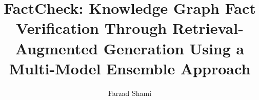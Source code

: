 \documentclass{DEIThesis}
\title{FactCheck: Knowledge Graph Fact Verification Through Retrieval-Augmented Generation Using a Multi-Model Ensemble Approach}
\author{Farzad Shami}
\begin{document}
    \makeatletter
    \DeclareRobustCommand\onedot{\futurelet\@let@token\@onedot}
    \def\@onedot{\ifx\@let@token.\else.\null\fi\xspace}

    \def\eg{\emph{e.g}\onedot} \def\Eg{\emph{E.g}\onedot}
    \def\ie{\emph{i.e}\onedot} \def\Ie{\emph{I.e}\onedot}
    \def\cf{\emph{c.f}\onedot} \def\Cf{\emph{C.f}\onedot}
    \def\etc{\emph{etc}\onedot} \def\vs{\emph{vs}\onedot}
    \def\wrt{w.r.t\onedot} \def\dof{d.o.f\onedot}
    \def\etal{\emph{et al}\onedot}
    \makeatother
    \frontmatter

    \mainmatter
    
    
    
    
    
    
    
    
    
    \backmatter
\end{document}
